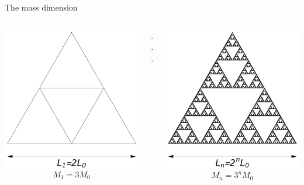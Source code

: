 \documentclass[xcolor=x11names,compress,professionalfonts]{beamer}
\renewcommand{\(}{\begin{columns}}
\renewcommand{\)}{\end{columns}}
\newcommand{\<}[1]{\begin{column}{#1}}
\renewcommand{\>}{\end{column}}
\begin{document}
\begin{frame}{The mass dimension}
\begin{itemize}
\begin{columns}
  \begin{column}{3cm}
  	\centering
     \includegraphics[scale=\s]{scale1.pdf}
     \scriptsize
    \[ M_1= 3M_0 \]
  \end{column}
  
  \begin{column}{1cm}
  \centering
  ...
  \end{column}
  
    \begin{column}{3cm}
    \centering
    \includegraphics[scale=\s]{scaleInfty.pdf}
    \scriptsize
    \[ M_n= 3^nM_0 \]
  \end{column}
\end{columns}


\end{itemize}
\end{frame}
\end{document}
